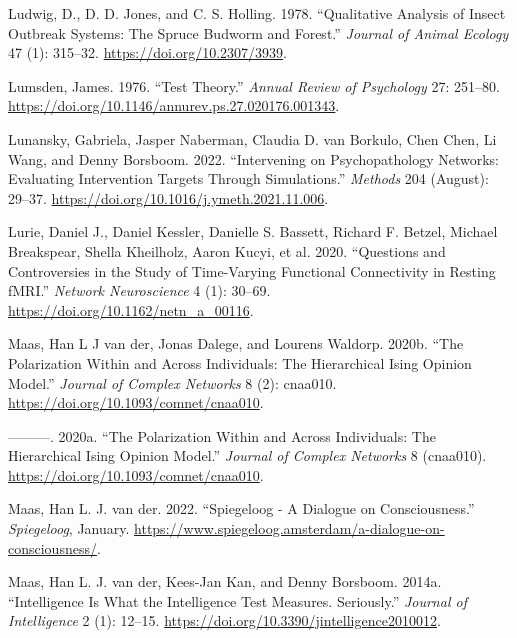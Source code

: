 \documentclass[
  a4paper,
  DIV=11,
  numbers=noendperiod,
  oneside]{scrreprt}
\newlength{\cslhangindent}
\newlength{\cslentryspacingunit} %
\newenvironment{CSLReferences}[2] %
 {%
  \setlength{\parindent}{0pt}
  \ifodd #1
  \let\oldpar\par
  \def\par{\hangindent=\cslhangindent\oldpar}
  \fi
  \setlength{\parskip}{#2\cslentryspacingunit}
 }%
 {}
\begin{document}
\begin{CSLReferences}{1}{0}
\leavevmode{}%
Ludwig, D., D. D. Jones, and C. S. Holling. 1978. {``Qualitative
Analysis of Insect Outbreak Systems: The Spruce Budworm and Forest.''}
\emph{Journal of Animal Ecology} 47 (1): 315--32.
\url{https://doi.org/10.2307/3939}.

\leavevmode{}%
Lumsden, James. 1976. {``Test Theory.''} \emph{Annual Review of
Psychology} 27: 251--80.
\url{https://doi.org/10.1146/annurev.ps.27.020176.001343}.

\leavevmode{}%
Lunansky, Gabriela, Jasper Naberman, Claudia D. van Borkulo, Chen Chen,
Li Wang, and Denny Borsboom. 2022. {``Intervening on Psychopathology
Networks: {Evaluating} Intervention Targets Through Simulations.''}
\emph{Methods} 204 (August): 29--37.
\url{https://doi.org/10.1016/j.ymeth.2021.11.006}.

\leavevmode{}%
Lurie, Daniel J., Daniel Kessler, Danielle S. Bassett, Richard F.
Betzel, Michael Breakspear, Shella Kheilholz, Aaron Kucyi, et al. 2020.
{``Questions and Controversies in the Study of Time-Varying Functional
Connectivity in Resting {fMRI}.''} \emph{Network Neuroscience} 4 (1):
30--69. \url{https://doi.org/10.1162/netn_a_00116}.

\leavevmode{}%
Maas, Han L J van der, Jonas Dalege, and Lourens Waldorp. 2020b. {``The
Polarization Within and Across Individuals: The Hierarchical Ising
Opinion Model.''} \emph{Journal of Complex Networks} 8 (2): cnaa010.
\url{https://doi.org/10.1093/comnet/cnaa010}.

\leavevmode{}%
---------. 2020a. {``The Polarization Within and Across Individuals: The
Hierarchical Ising Opinion Model.''} \emph{Journal of Complex Networks}
8 (cnaa010). \url{https://doi.org/10.1093/comnet/cnaa010}.

\leavevmode{}%
Maas, Han L. J. van der. 2022. {``Spiegeloog - A Dialogue on
Consciousness.''} \emph{Spiegeloog}, January.
\url{https://www.spiegeloog.amsterdam/a-dialogue-on-consciousness/}.

\leavevmode{}%
Maas, Han L. J. van der, Kees-Jan Kan, and Denny Borsboom. 2014a.
{``Intelligence Is What the Intelligence Test Measures. Seriously.''}
\emph{Journal of Intelligence} 2 (1): 12--15.
\url{https://doi.org/10.3390/jintelligence2010012}.


\end{CSLReferences}
\end{document}
